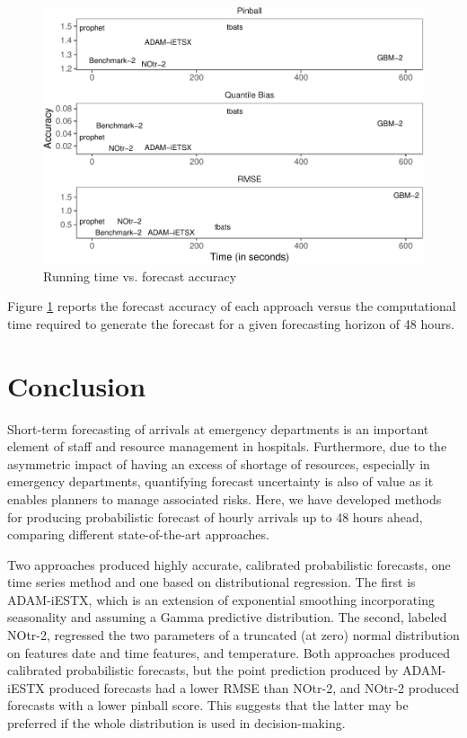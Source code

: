 \documentclass[]{elsarticle} %
\begin{document}
\begin{figure}[H]

{\centering \includegraphics[width=0.7\linewidth]{paper_files/figure-latex/time-accuracy-1} 

}

\caption{Running time vs. forecast accuracy}\label{fig:time-accuracy}
\end{figure}

Figure \ref{fig:time-accuracy} reports the forecast accuracy of each approach versus the computational time required to generate the forecast for a given forecasting horizon of 48 hours.

\hypertarget{conclusion}{%
\section{Conclusion}\label{conclusion}}

Short-term forecasting of arrivals at emergency departments is an important element of staff and resource management in hospitals. Furthermore, due to the asymmetric impact of having an excess of shortage of resources, especially in emergency departments, quantifying forecast uncertainty is also of value as it enables planners to manage associated risks. Here, we have developed methods for producing probabilistic forecast of hourly arrivals up to 48 hours ahead, comparing different state-of-the-art approaches.

Two approaches produced highly accurate, calibrated probabilistic forecasts, one time series method and one based on distributional regression. The first is ADAM-iESTX, which is an extension of exponential smoothing incorporating seasonality and assuming a Gamma predictive distribution. The second, labeled NOtr-2, regressed the two parameters of a truncated (at zero) normal distribution on features date and time features, and temperature. Both approaches produced calibrated probabilistic forecasts, but the point prediction produced by ADAM-iESTX produced forecasts had a lower RMSE than NOtr-2, and NOtr-2 produced forecasts with a lower pinball score. This suggests that the latter may be preferred if the whole distribution is used in decision-making.
\end{document}
